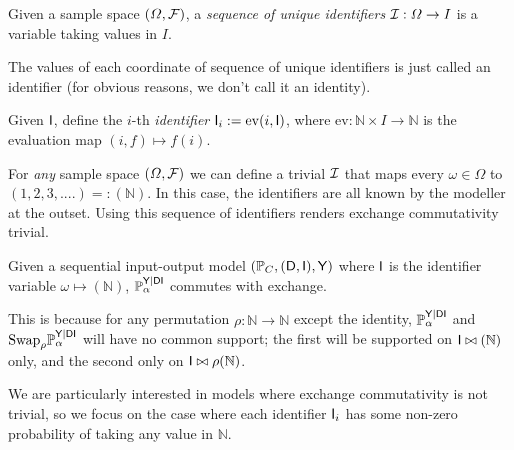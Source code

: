 \begin{definition}
Given a sample space $(\Omega,\mathcal{F})$, a \emph{sequence of unique identifiers} $\mathcal{I}:\Omega\to I$ is a variable taking values in $I$.
\end{definition}

The values of each coordinate of sequence of unique identifiers is just called an identifier (for obvious reasons, we don't call it an identity).

\begin{definition}[Identifiers]
Given $\mathsf{I}$, define the $i$-th \emph{identifier} $\mathsf{I}_i:=\mathrm{ev}(i,\mathsf{I})$, where $\mathrm{ev}:\mathbb{N}\times I\to \mathbb{N}$ is the evaluation map $(i,f)\mapsto f(i)$.
\end{definition}

For \emph{any} sample space $(\Omega,\mathcal{F})$ we can define a trivial $\mathcal{I}$ that maps every $\omega\in\Omega$ to $(1,2,3,....)=:(\mathbb{N})$. In this case, the identifiers are all known by the modeller at the outset. Using this sequence of identifiers renders exchange commutativity trivial.

\begin{example}\label{eq:il_exchc}
Given a sequential input-output model $(\mathbb{P}_C, (\mathsf{D},\mathsf{I}),\mathsf{Y})$ where $\mathsf{I}$ is the identifier variable $\omega\mapsto (\mathbb{N})$, $\mathbb{P}_\alpha^{\mathsf{Y}|\mathsf{DI}}$ commutes with exchange.

This is because for any permutation $\rho:\mathbb{N}\to\mathbb{N}$ except the identity, $\mathbb{P}_\alpha^{\mathsf{Y}|\mathsf{DI}}$ and $\text{Swap}_{\rho}\mathbb{P}_\alpha^{\mathsf{Y}|\mathsf{DI}}$ will have no common support; the first will be supported on $\mathsf{I}\bowtie (\mathbb{N})$ only, and the second only on $\mathsf{I}\bowtie \rho(\mathbb{N})$.
\end{example}

We are particularly interested in models where exchange commutativity is not trivial, so we focus on the case where each identifier $\mathsf{I}_i$ has some non-zero probability of taking any value in $\mathbb{N}$. 



